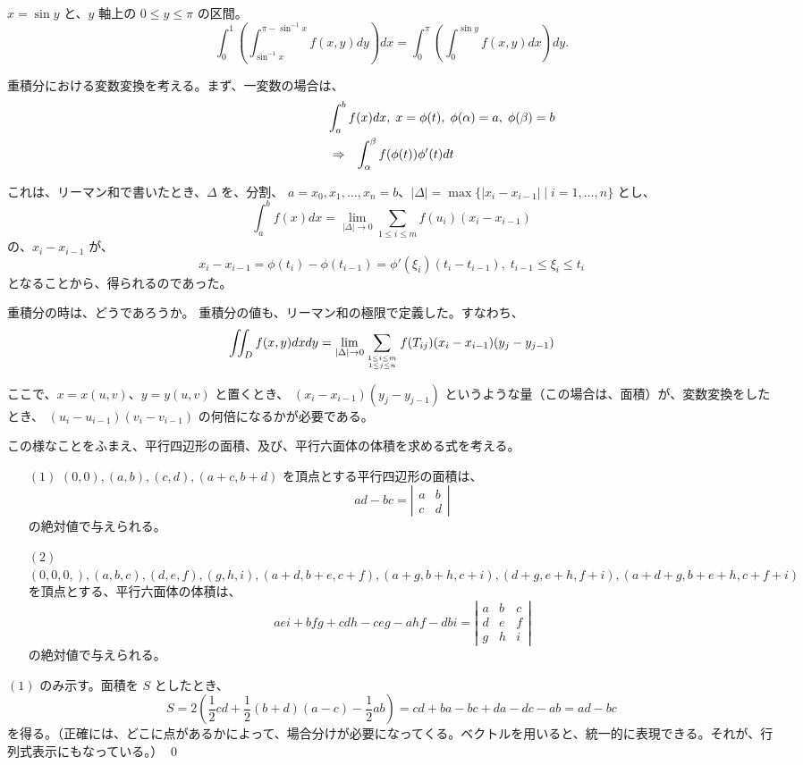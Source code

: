 \begin{eg}
$x = \sin y$ と、$y$ 軸上の $0\leq y\leq \pi$ の区間。
$$\int^1_0\left(\int^{\pi-\sin^{-1}x}_{\sin^{-1}x}f(x,y)dy\right)dx = 
\int_0^\pi\left(\int_0^{\sin y}f(x,y)dx\right)dy.$$
\end{eg}

重積分における変数変換を考える。まず、一変数の場合は、
\begin{eqnarray*}
\lefteqn{\int_a^b f(x)dx,\;x = \phi(t),\;\phi(\alpha) = a,\;\phi(\beta) = b}\\
& \Rightarrow & \int_\alpha^\beta f(\phi(t))\phi'(t)dt
\end{eqnarray*}

これは、リーマン和で書いたとき、$\Delta$ を、分割、
$a = x_0,x_1,\ldots, x_n = b$、$|\Delta| = \max\{|x_i-x_{i-1}|\mid i = 1,\ldots, n\}$ とし、
\begin{equation}
\int_a^b f(x)dx = \lim_{|\Delta|\to 0}\sum_{1\leq i\leq m}f(u_i)(x_i-x_{i-1})
\end{equation}
の、$x_i - x_{i-1}$ が、
$$x_i - x_{i-1} = \phi(t_i) - \phi(t_{i-1}) = \phi'(\xi_i)(t_i-t_{i-1}), \;t_{i-1}\leq \xi_i \leq t_i$$
となることから、得られるのであった。

重積分の時は、どうであろうか。
重積分の値も、リーマン和の極限で定義した。すなわち、
$$\iint_Df(x,y)dxdy = 
\lim_{|\Delta|\to 0}\sum_{{1\leq i\leq m}\atop{1\leq j\leq n}}f(T_{ij})(x_i-x_{i-1})(y_j-y_{j-1})$$

ここで、$x = x(u,v)$、$y = y(u,v)$ と置くとき、
$(x_i-x_{i-1})(y_j-y_{j-1})$ というような量（この場合は、面積）が、変数変換をしたとき、
$(u_i-u_{i-1})(v_i-v_{i-1})$ の何倍になるかが必要である。

この様なことをふまえ、平行四辺形の面積、及び、平行六面体の体積を求める式を考える。

\begin{lemma} \label{lemma:para}
\begin{itemize}
\item[$(1)$] $(0,0),(a,b),(c,d),(a+c,b+d)$ を頂点とする平行四辺形の面積は、
$$ad - bc = \left|\begin{array}{cc} a & b\\ c & d \end{array}\right|$$
の絶対値で与えられる。
\item[$(2)$] $(0,0,0,),(a,b,c),(d,e,f),(g,h,i),(a+d,b+e,c+f),(a+g,b+h,c+i),(d+g,e+h,f+i),(a+d+g,b+e+h,c+f+i)$ を頂点とする、平行六面体の体積は、
\begin{equation}
aei + bfg + cdh - ceg-ahf-dbi
= \left|\begin{array}{ccc} a & b & c\\ d & e & f \\ g & h & i\end{array}\right|
\end{equation}
の絶対値で与えられる。
\end{itemize}
\end{lemma}
\proof
$(1)$ のみ示す。面積を $S$ としたとき、
$$S = 2(\frac12cd + \frac12(b+d)(a-c) - \frac12ab) = cd + ba - bc + da - dc - ab = ad - bc$$
を得る。（正確には、どこに点があるかによって、場合分けが必要になってくる。ベクトルを用いると、統一的に表現できる。それが、行列式表示にもなっている。）
\qed

